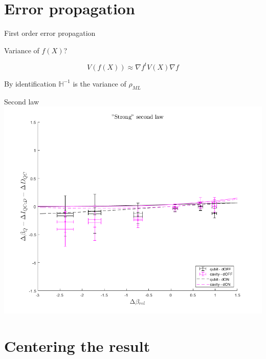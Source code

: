 \documentclass{beamer}
\newcommand{\ml}{_{M\!L}}
\begin{document}
\section{Error propagation}

\begin{frame}{First order error propagation}
  \begin{center}
    Variance of $f(X)$?
  \end{center}
\[V(f(X)) \approx \nabla f^t V(X) \nabla f\]

\pause{}\vspace{5mm}

\begin{center}
By identification $\mathbb H^{-1}$ is the variance of $\rho\ml$
\end{center}

\end{frame}

\begin{frame}{Second law}
  \centering
  \includegraphics[height=\textheight]{plots/Strg2.png}
\end{frame}


\section{Centering the result}
\end{document}
